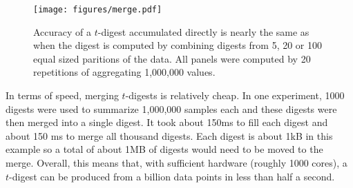 \documentclass[]{statsoc}
\begin{document}
\begin{figure}[htb] %
   \centering
   \texttt{[image: figures/merge.pdf]} 
   \caption{Accuracy of a $t$-digest accumulated directly is nearly the same as when the digest is computed by combining digests from 5, 20 or 100 equal sized paritions of the data.  All panels were computed by 20 repetitions of aggregating 1,000,000 values. }
   \label{fig:merge}
\end{figure}

In terms of speed, merging $t$-digests is relatively cheap. In one experiment, 1000 digests were used to summarize 1,000,000 samples each and these digests were then merged into a single digest. It took about 150ms to fill each digest and about 150 ms to merge all thousand digests. Each digest is about 1kB in this example so a total of about 1MB of digests would need to be moved to the merge. Overall, this means that, with sufficient hardware (roughly 1000 cores), a $t$-digest can be produced from a billion data points in less than half a second. 
\end{document}
